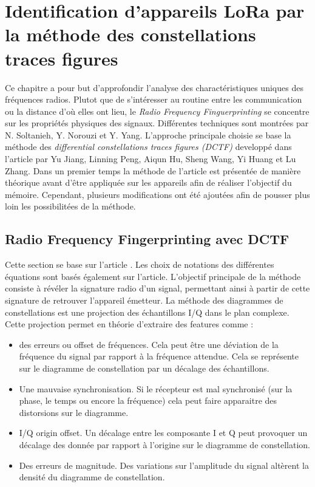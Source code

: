 \chapter{Identification d'appareils LoRa par la méthode des constellations traces figures}

Ce chapitre a pour but d'approfondir l'analyse des charactéristiques uniques des fréquences radios. Plutot que de s'intéresser au routine entre les communication ou la distance d'où elles ont lieu, le \textit{Radio Frequency Finguerprinting} se concentre sur les propriétés physiques des signaux. Différentes techniques sont montrées par N. Soltanieh, Y. Norouzi et Y. Yang\cite{rffi1}. L'approche principale choisie se base la méthode des \textit{differential constellations traces figures (DCTF)} developpé dans l'article \cite{loraDCTF} par Yu Jiang, Linning Peng, Aiqun Hu, Sheng Wang, Yi Huang et Lu Zhang. Dans un premier temps la méthode de l'article est présentée de manière théorique avant d'être appliquée sur les appareils afin de réaliser l'objectif du mémoire. Cependant, plusieurs modifications ont été ajoutées afin de pousser plus loin les possibilitées de la méthode.

\section{Radio Frequency Fingerprinting avec DCTF}\label{DCTF}

Cette section se base sur l'article \cite{loraDCTF}. Les choix de notations des différentes équations sont basés également sur l'article. L'objectif principale de la méthode consiste à révéler la signature radio d'un signal, permettant ainsi à partir de cette signature de retrouver l'appareil émetteur. La méthode des diagrammes de constellations est une projection des échantillons I/Q dans le plan complexe. Cette projection permet en théorie d'extraire des features comme :

\begin{itemize}
\item des erreurs ou offset de fréquences. Cela peut être une déviation de la fréquence du signal par rapport à la fréquence attendue. Cela se représente sur le diagramme de constellation par un décalage des échantillons. 
\item Une mauvaise synchronisation. Si le récepteur est mal synchronisé (sur la phase, le temps ou encore la fréquence) cela peut faire apparaitre des distorsions sur le diagramme.
\item I/Q origin offset. Un décalage entre les composante I et Q peut provoquer un décalage des donnée par rapport à l'origine sur le diagramme de constellation.
\item Des erreurs de magnitude. Des variations sur l'amplitude du signal altèrent la densité du diagramme de constellation.
\end{itemize}

